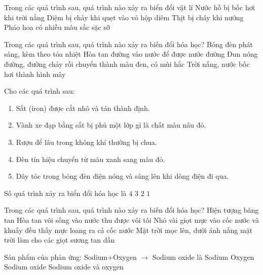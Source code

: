 \begin{ex}
	Trong các quá trình sau, quá trình nào xảy ra biển đổi vật lí
	\choice
	{Nước hồ bị bốc hơi khi trời nắng}
	{Diệm bị chảy khi quẹt vào vỏ hộp diêm}
	{Thịt bị cháy khi nướng}
	{Pháo hoa có nhiều màu sắc sặc sỡ}
	\loigiai{}
\end{ex}

\begin{ex}
	Trong các quá trình sau, quá trình nào xảy ra biến đổi hóa học?
	\choice
	{Bóng đèn phát sáng, kèm theo tỏa nhiệt}
	{Hòa tan đường vào nước để được nước đường}
	{Đun nóng đường, đường chảy rồi chuyển thành màu đen, có mùi hắc}
	{Trời nắng, nước bốc hơi thành hình mây}
	\loigiai{}
\end{ex}

\begin{ex}
	Cho các quá trình sau:
	\begin{enumerate}[(1)]
		\item  Sắt (iron) được cắt nhỏ và tán thành định.
		\item  Vành xe đạp bằng sắt bị phủ một lớp gỉ là chất màu nâu đỏ.
		\item  Rượu để lâu trong không khí thường bị chua.
		\item  Đèn tín hiệu chuyển từ màu xanh sang màu đỏ.
		\item  Dây tóc trong bóng đèn điện nóng và sáng lên khi dòng điện đi qua.
	\end{enumerate}
	Số quá trình xảy ra biển đổi hóa học là
	\choice
	{$4$}
	{$3$}
	{$2$}
	{$1$}
	\loigiai{}
\end{ex}

\begin{ex}
	Trong các quá trình sau, quá trình nào xảy ra biến đổi hóa học?
	\choice
	{Hiện tượng băng tan}
	{Hòa tan vôi sống vào nước thu được vôi tôi}
	{Nhỏ vài giọt mực vào cốc nước và khuấy đều thấy mực loang ra cả cốc nước}
	{Mặt trời mọc lên, dưới ánh nắng mặt trời làm cho các giọt sương tan dần}
	\loigiai{}
\end{ex}

\begin{ex}
	Sản phẩm của phản ứng: Sodium+Oxygen $\to$ Sodium oxide là
	\choice
	{Sodium}
	{Oxygen}
	{Sodium oxide}
	{Sodium oxide và oxygen}
	\loigiai{}
\end{ex}

